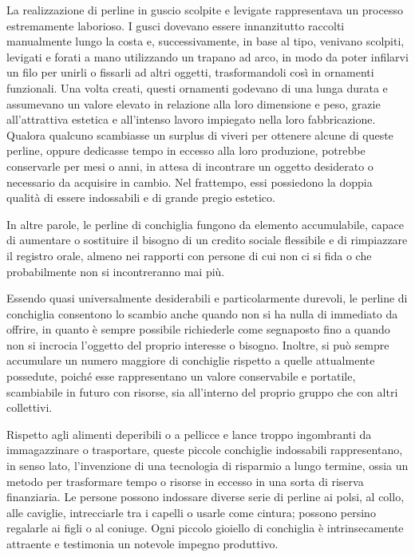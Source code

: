 \documentclass[
  a5paper,
  smalldemyvopaper,10pt,twoside,onecolumn,openright,extrafontsizes,hidelinks]{memoir}
\begin{document}
La realizzazione di perline in guscio scolpite e levigate rappresentava
un processo estremamente laborioso. I gusci dovevano essere innanzitutto
raccolti manualmente lungo la costa e, successivamente, in base al tipo,
venivano scolpiti, levigati e forati a mano utilizzando un trapano ad
arco, in modo da poter infilarvi un filo per unirli o fissarli ad altri
oggetti, trasformandoli così in ornamenti funzionali. Una volta creati,
questi ornamenti godevano di una lunga durata e assumevano un valore
elevato in relazione alla loro dimensione e peso, grazie all'attrattiva
estetica e all'intenso lavoro impiegato nella loro fabbricazione.
Qualora qualcuno scambiasse un surplus di viveri per ottenere alcune di
queste perline, oppure dedicasse tempo in eccesso alla loro produzione,
potrebbe conservarle per mesi o anni, in attesa di incontrare un oggetto
desiderato o necessario da acquisire in cambio. Nel frattempo, essi
possiedono la doppia qualità di essere indossabili e di grande pregio
estetico.

In altre parole, le perline di conchiglia fungono da elemento
accumulabile, capace di aumentare o sostituire il bisogno di un credito
sociale flessibile e di rimpiazzare il registro orale, almeno nei
rapporti con persone di cui non ci si fida o che probabilmente non si
incontreranno mai più.

Essendo quasi universalmente desiderabili e particolarmente durevoli, le
perline di conchiglia consentono lo scambio anche quando non si ha nulla
di immediato da offrire, in quanto è sempre possibile richiederle come
segnaposto fino a quando non si incrocia l'oggetto del proprio interesse
o bisogno. Inoltre, si può sempre accumulare un numero maggiore di
conchiglie rispetto a quelle attualmente possedute, poiché esse
rappresentano un valore conservabile e portatile, scambiabile in futuro
con risorse, sia all'interno del proprio gruppo che con altri
collettivi.

Rispetto agli alimenti deperibili o a pellicce e lance troppo
ingombranti da immagazzinare o trasportare, queste piccole conchiglie
indossabili rappresentano, in senso lato, l'invenzione di una tecnologia
di risparmio a lungo termine, ossia un metodo per trasformare tempo o
risorse in eccesso in una sorta di riserva finanziaria. Le persone
possono indossare diverse serie di perline ai polsi, al collo, alle
caviglie, intrecciarle tra i capelli o usarle come cintura; possono
persino regalarle ai figli o al coniuge. Ogni piccolo gioiello di
conchiglia è intrinsecamente attraente e testimonia un notevole impegno
produttivo.
\end{document}
